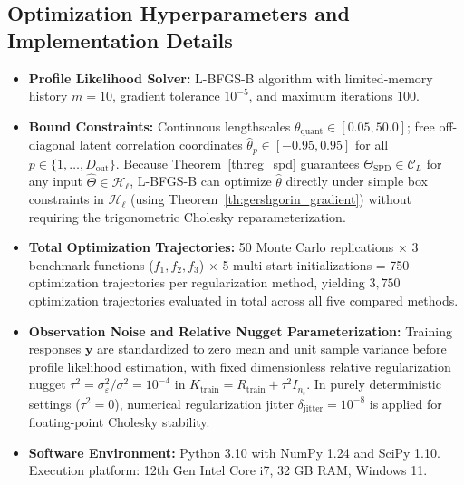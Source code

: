 \documentclass[default,sn-mathphys,Numbered]{sn-jnl}
\theoremstyle{thmstyleone}
\theoremstyle{thmstylethree}
\theoremstyle{thmstyletwo}
\newcommand{\outp}{\text{out}}
\begin{document}
\begin{appendices}
\subsection{Optimization Hyperparameters and Implementation Details}
\begin{itemize}
    \item \textbf{Profile Likelihood Solver:} L-BFGS-B algorithm with limited-memory history $m = 10$, gradient tolerance $10^{-5}$, and maximum iterations $100$.
    \item \textbf{Bound Constraints:} Continuous lengthscales $\theta_{\mathrm{quant}} \in [0.05, 50.0]$; free off-diagonal latent correlation coordinates $\hat{\theta}_p \in [-0.95, 0.95]$ for all $p \in \{1, \ldots, D_{\outp}\}$. Because Theorem~\ref{th:reg_spd} guarantees $\Theta_{\mathrm{SPD}} \in \mathcal{C}_L$ for any input $\hat{\Theta} \in \mathcal{H}_\ell$, L-BFGS-B can optimize $\hat{\theta}$ directly under simple box constraints in $\mathcal{H}_\ell$ (using Theorem~\ref{th:gershgorin_gradient}) without requiring the trigonometric Cholesky reparameterization.
    \item \textbf{Total Optimization Trajectories:} 50 Monte Carlo replications $\times$ 3 benchmark functions ($f_1, f_2, f_3$) $\times$ 5 multi-start initializations = 750 optimization trajectories per regularization method, yielding $3{,}750$ optimization trajectories evaluated in total across all five compared methods.
    \item \textbf{Observation Noise and Relative Nugget Parameterization:} Training responses $\bm{y}$ are standardized to zero mean and unit sample variance before profile likelihood estimation, with fixed dimensionless relative regularization nugget $\tau^2 = \sigma_\varepsilon^2 / \sigma^2 = 10^{-4}$ in $K_{\mathrm{train}} = R_{\mathrm{train}} + \tau^2 I_{n_t}$. In purely deterministic settings ($\tau^2 = 0$), numerical regularization jitter $\delta_{\mathrm{jitter}} = 10^{-8}$ is applied for floating-point Cholesky stability.
    \item \textbf{Software Environment:} Python 3.10 with NumPy 1.24 and SciPy 1.10. Execution platform: 12th Gen Intel Core i7, 32 GB RAM, Windows 11.
\end{itemize}

\end{appendices}

\backmatter

\end{document}
